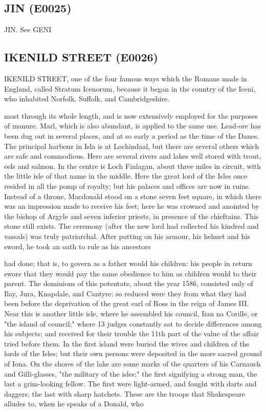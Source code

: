 \documentclass{article}
\begin{document}
\subsection*{JIN (E0025)}
JIN. See GENI

\subsection*{IKENILD STREET (E0026)}
IKENILD STREET, one of the four famous ways which the Romans made in England, called Stratum Icenorum, because it began in the country of the Iceni, who inhabited Norfolk, Suffolk, and Cambridgeshire.

most through its whole length, and is now extensively employed for the purposes of manure. Marl, which is also abundant, is applied to the same use. Lead-ore has been dug out in several places, and at so early a period as the time of the Danes. The principal harbour in Isla is at Lochindaal, but there are several others which are safe and commodious. Here are several rivers and lakes well stored with trout, eels and salmon. In the centre is Loch Finlagan, about three miles in circuit, with the little isle of that name in the middle. Here the great lord of the Isles once resided in all the pomp of royalty; but his palaces and offices are now in ruins. Instead of a throne, Macdonald stood on a stone seven feet square, in which there was an impression made to receive his feet; here he was crowned and anointed by the bishop of Argyle and seven inferior priests, in presence of the chieftains. This stone still exists. The ceremony (after the new lord had collected his kindred and vassals) was truly patriarchal. After putting on his armour, his helmet and his sword, he took an oath to rule as his ancestors

had done; that is, to govern as a father would his children: his people in return swore that they would pay the same obedience to him as children would to their parent. The dominions of this potentate, about the year 1586, consisted only of Ilay, Jura, Knapdale, and Cantyre: so reduced were they from what they had been before the deprivation of the great earl of Ross in the reign of James III. Near this is another little isle, where he assembled his council, Iian na Corille, or "the island of council;" where 13 judges constantly sat to decide differences among his subjects; and received for their trouble the 11th part of the value of the affair tried before them. In the first island were buried the wives and children of the lords of the Isles; but their own persons were deposited in the more sacred ground of Iona. On the shores of the lake are some marks of the quarters of his Carnauch and Gilli-glasses, "the military of the isles;" the first signifying a strong man, the last a grim-looking fellow. The first were light-armed, and fought with darts and daggers; the last with sharp hatchets. These are the troops that Shakespeare alludes to, when he speaks of a Donald, who
\end{document}
